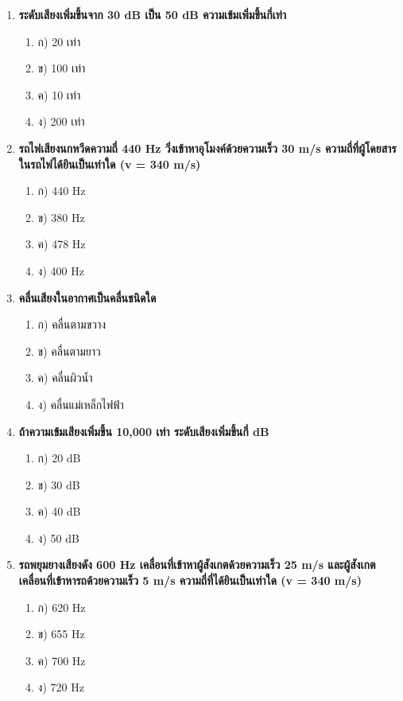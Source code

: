 \documentclass[12pt]{article}
\begin{document}
\begin{enumerate}
\begin{enumerate}
\item ข) สูง
\item ค) ปานกลาง
\item ง) คงที่
\end{enumerate}
\item \textbf{ระดับเสียงเพิ่มขึ้นจาก 30 dB เป็น 50 dB ความเข้มเพิ่มขึ้นกี่เท่า}
\begin{enumerate}
\item ก) 20 เท่า
\item ข) 100 เท่า
\item ค) 10 เท่า
\item ง) 200 เท่า
\end{enumerate}
\item \textbf{รถไฟเสียงนกหวีดความถี่ 440 Hz วิ่งเข้าหาอุโมงค์ด้วยความเร็ว 30 m/s ความถี่ที่ผู้โดยสารในรถไฟได้ยินเป็นเท่าใด (v = 340 m/s)}
\begin{enumerate}
\item ก) 440 Hz
\item ข) 380 Hz
\item ค) 478 Hz
\item ง) 400 Hz
\end{enumerate}
\item \textbf{คลื่นเสียงในอากาศเป็นคลื่นชนิดใด}
\begin{enumerate}
\item ก) คลื่นตามขวาง
\item ข) คลื่นตามยาว
\item ค) คลื่นผิวน้ำ
\item ง) คลื่นแม่เหล็กไฟฟ้า
\end{enumerate}
\item \textbf{ถ้าความเข้มเสียงเพิ่มขึ้น 10,000 เท่า ระดับเสียงเพิ่มขึ้นกี่ dB}
\begin{enumerate}
\item ก) 20 dB
\item ข) 30 dB
\item ค) 40 dB
\item ง) 50 dB
\end{enumerate}
\item \textbf{รถพยุมยางเสียงดัง 600 Hz เคลื่อนที่เข้าหาผู้สังเกตด้วยความเร็ว 25 m/s และผู้สังเกตเคลื่อนที่เข้าหารถด้วยความเร็ว 5 m/s ความถี่ที่ได้ยินเป็นเท่าใด (v = 340 m/s)}
\begin{enumerate}
\item ก) 620 Hz
\item ข) 655 Hz
\item ค) 700 Hz
\item ง) 720 Hz

\end{enumerate}
\end{enumerate}
\end{document}
